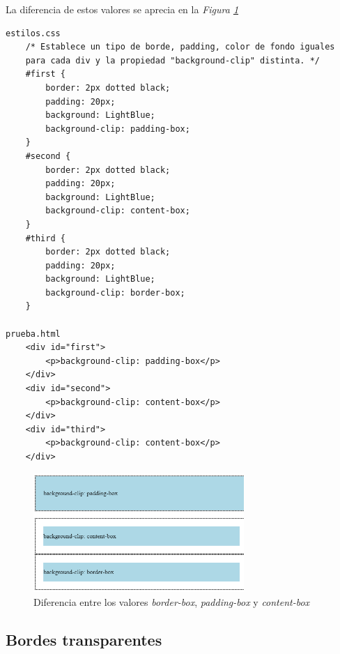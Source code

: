 La diferencia de estos valores se aprecia en la \textit{Figura \ref{fig: 48}}
\begin{lstlisting}
estilos.css
    /* Establece un tipo de borde, padding, color de fondo iguales
    para cada div y la propiedad "background-clip" distinta. */
    #first {
        border: 2px dotted black;
        padding: 20px;
        background: LightBlue;
        background-clip: padding-box;
    }
    #second {
        border: 2px dotted black;
        padding: 20px;
        background: LightBlue;
        background-clip: content-box;
    }
    #third {
        border: 2px dotted black;
        padding: 20px;
        background: LightBlue;
        background-clip: border-box;
    }

prueba.html
    <div id="first">
        <p>background-clip: padding-box</p>
    </div>
    <div id="second">
        <p>background-clip: content-box</p>
    </div>
    <div id="third">
        <p>background-clip: content-box</p>
    </div>
\end{lstlisting}
\begin{figure}[H]
    \centering
    \caption{Diferencia entre los valores \textit{border-box}, \textit{padding-box} y \textit{content-box}}
    \label{fig: 48}
    \includegraphics[width=8cm]{ss/background-clip.png}
\end{figure}


\subsection{Bordes transparentes}


